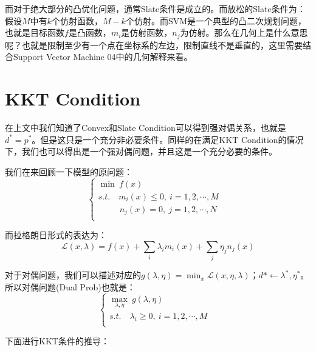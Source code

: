 \documentclass[a4paper]{article}
\begin{document}
而对于绝大部分的凸优化问题，通常Slate条件是成立的。而放松的Slate条件为：假设$M$中有$k$个仿射函数，$M-k$个仿射。而SVM是一个典型的凸二次规划问题，也就是目标函数$f$是凸函数，$m_i$是仿射函数，$n_j$为仿射。那么在几何上是什么意思呢？也就是限制至少有一个点在坐标系的左边，限制直线不是垂直的，这里需要结合Support Vector Machine 04中的几何解释来看。

\section{KKT Condition}
在上文中我们知道了Convex和Slate Condition可以得到强对偶关系，也就是$d^\ast = p^\ast$。但是这只是一个充分非必要条件。同样的在满足KKT Condition的情况下，我们也可以得出是一个强对偶问题，并且这是一个充分必要的条件。

我们在来回顾一下模型的原问题：
\begin{equation}
    \left\{
        \begin{array}{ll}
        \min\ f(x) & \\
        s.t. \quad m_i(x)\leq 0, \ i = 1, 2, \cdots, M & \\
        \ \; \qquad n_j(x)= 0, \ j = 1, 2, \cdots, N & \\
        \end{array}
    \right.
\end{equation}

而拉格朗日形式的表达为：
\begin{equation}
    \mathcal{L}(x,\lambda) = f(x) + \sum_i \lambda_i m_i(x) + \sum_j \eta_j n_j(x) 
\end{equation}

对于对偶问题，我们可以描述对应的$g(\lambda,\eta) = \min_x \mathcal{L}(x,\eta,\lambda)$；$d\ast \longleftarrow \lambda^\ast,\eta^\ast$。所以对偶问题(Dual Prob)也就是：
\begin{equation}
    \left\{
        \begin{array}{ll}
        \max_{\lambda,\eta}\ g(\lambda,\eta) & \\
        s.t. \quad \lambda_i\geq 0, \ i = 1, 2, \cdots, M & \\
        \end{array}
    \right.
\end{equation}

下面进行KKT条件的推导：
\end{document}
